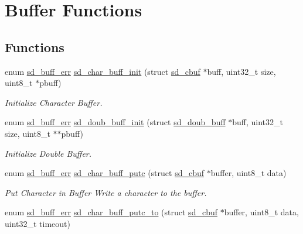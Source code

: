 \hypertarget{group___s_d___buffer___functions}{}\section{Buffer Functions}
\label{group___s_d___buffer___functions}
\subsection*{Functions}
\begin{DoxyCompactItemize}
\item 
enum \mbox{\hyperlink{group___s_d___buffer___types_ga012d8a07d989f00e3f9c4a2f62743de4}{sd\+\_\+buff\+\_\+err}} \mbox{\hyperlink{group___s_d___buffer___functions_ga5c105cd566aea7ca95c4b9702b083cc1}{sd\+\_\+char\+\_\+buff\+\_\+init}} (struct \mbox{\hyperlink{structsd__cbuf}{sd\+\_\+cbuf}} $\ast$buff, uint32\+\_\+t size, uint8\+\_\+t $\ast$pbuff)
\begin{DoxyCompactList}\small\item\em Initialize Character Buffer. \end{DoxyCompactList}\item 
enum \mbox{\hyperlink{group___s_d___buffer___types_ga012d8a07d989f00e3f9c4a2f62743de4}{sd\+\_\+buff\+\_\+err}} \mbox{\hyperlink{group___s_d___buffer___functions_ga1b12fdfcd944d5f41960209072dbda59}{sd\+\_\+doub\+\_\+buff\+\_\+init}} (struct \mbox{\hyperlink{structsd__doub__buff}{sd\+\_\+doub\+\_\+buff}} $\ast$buff, uint32\+\_\+t size, uint8\+\_\+t $\ast$$\ast$pbuff)
\begin{DoxyCompactList}\small\item\em Initialize Double Buffer. \end{DoxyCompactList}\item 
enum \mbox{\hyperlink{group___s_d___buffer___types_ga012d8a07d989f00e3f9c4a2f62743de4}{sd\+\_\+buff\+\_\+err}} \mbox{\hyperlink{group___s_d___buffer___functions_gac8f2c2617479d49b27397bab04154ec9}{sd\+\_\+char\+\_\+buff\+\_\+putc}} (struct \mbox{\hyperlink{structsd__cbuf}{sd\+\_\+cbuf}} $\ast$buffer, uint8\+\_\+t data)
\begin{DoxyCompactList}\small\item\em Put Character in Buffer Write a character to the buffer. \end{DoxyCompactList}\item 
enum \mbox{\hyperlink{group___s_d___buffer___types_ga012d8a07d989f00e3f9c4a2f62743de4}{sd\+\_\+buff\+\_\+err}} \mbox{\hyperlink{group___s_d___buffer___functions_gabe452c7248eb96b220e17402b476bc09}{sd\+\_\+char\+\_\+buff\+\_\+putc\+\_\+to}} (struct \mbox{\hyperlink{structsd__cbuf}{sd\+\_\+cbuf}} $\ast$buffer, uint8\+\_\+t data, uint32\+\_\+t timeout)
$$
\end{DoxyCompactItemize}
